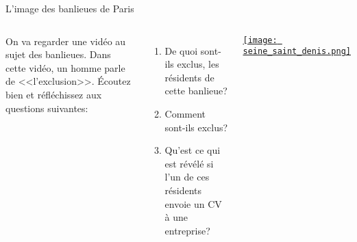\begin{frame}{L'image des banlieues de Paris}
  \begin{columns}
      On va regarder une vidéo au sujet des banlieues.
      Dans cette vidéo, un homme parle de <<l'exclusion>>.
      Écoutez bien et réfléchissez aux questions suivantes:
      \begin{enumerate}
        \item De quoi sont-ils exclus, les résidents de cette banlieue?
        \item Comment sont-ils exclus?
        \item Qu'est ce qui est révélé si l'un de ces résidents envoie un CV à une entreprise?
      \end{enumerate}
      \begin{center}
        \href{https://www.youtube.com/watch?v=uF-OQ2cr1gI}{\texttt{[image: seine\_saint\_denis.png]}}
      \end{center}
  \end{columns}
\end{frame}